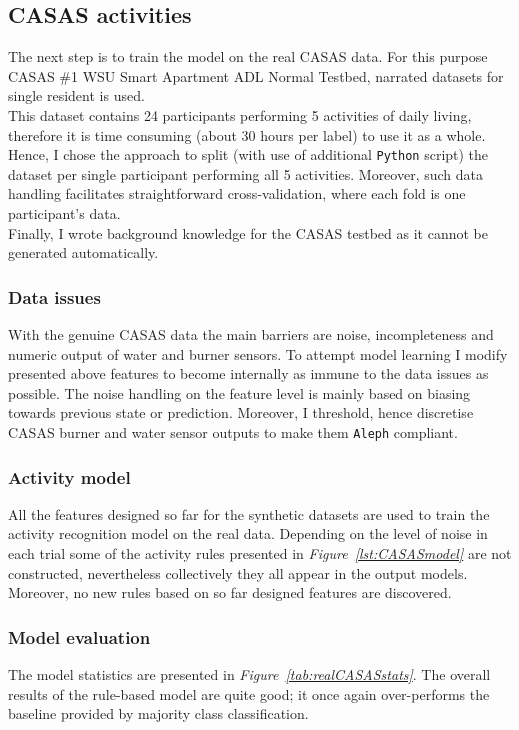 \documentclass[10pt, a4paper, pdflatex, leqno, twoside, openright]{report}
\begin{document}
    \subsection{CASAS activities}
The next step is to train the model on the real CASAS data. For this purpose CASAS \#1 WSU Smart Apartment ADL Normal Testbed, narrated datasets for single resident is used.\\
This dataset contains 24 participants performing 5 activities of daily living, therefore it is time consuming (about 30 hours per label) to use it as a whole. Hence, I chose the approach to split (with use of additional \texttt{Python} script) the dataset per single participant performing all 5 activities. Moreover, such data handling facilitates straightforward cross-validation, where each fold is one participant's data.\\
Finally, I wrote background knowledge for the CASAS testbed as it cannot be generated automatically.

      \subsubsection{Data issues}
With the genuine CASAS data the main barriers are noise, incompleteness and numeric output of water and burner sensors. To attempt model learning I modify presented above features to become internally as immune to the data issues as possible. The noise handling on the feature level is mainly based on biasing towards previous state or prediction. Moreover, I threshold, hence discretise CASAS burner and water sensor outputs to make them \texttt{Aleph} compliant.

      \subsubsection{Activity model}
All the features designed so far for the synthetic datasets are used to train the activity recognition model on the real data. Depending on the level of noise in each trial some of the activity rules presented in \emph{Figure~\ref{lst:CASASmodel}} are not constructed, nevertheless collectively they all appear in the output models. Moreover, no new rules based on so far designed features are discovered.

      \subsubsection{Model evaluation}
The model statistics are presented in \emph{Figure~\ref{tab:realCASASstats}}. The overall results of the rule-based model are quite good; it once again over-performs the baseline provided by majority class classification.
\end{document}
